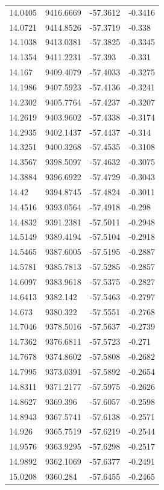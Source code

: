 \begin{table}[H]
\begin{tabular}{llll}
14.0405 & 9416.6669 & -57.3612 & -0.3416 \\
14.0721 & 9414.8526 & -57.3719 & -0.338 \\
14.1038 & 9413.0381 & -57.3825 & -0.3345 \\
14.1354 & 9411.2231 & -57.393 & -0.331 \\
14.167 & 9409.4079 & -57.4033 & -0.3275 \\
14.1986 & 9407.5923 & -57.4136 & -0.3241 \\
14.2302 & 9405.7764 & -57.4237 & -0.3207 \\
14.2619 & 9403.9602 & -57.4338 & -0.3174 \\
14.2935 & 9402.1437 & -57.4437 & -0.314 \\
14.3251 & 9400.3268 & -57.4535 & -0.3108 \\
14.3567 & 9398.5097 & -57.4632 & -0.3075 \\
14.3884 & 9396.6922 & -57.4729 & -0.3043 \\
14.42 & 9394.8745 & -57.4824 & -0.3011 \\
14.4516 & 9393.0564 & -57.4918 & -0.298 \\
14.4832 & 9391.2381 & -57.5011 & -0.2948 \\
14.5149 & 9389.4194 & -57.5104 & -0.2918 \\
14.5465 & 9387.6005 & -57.5195 & -0.2887 \\
14.5781 & 9385.7813 & -57.5285 & -0.2857 \\
14.6097 & 9383.9618 & -57.5375 & -0.2827 \\
14.6413 & 9382.142 & -57.5463 & -0.2797 \\
14.673 & 9380.322 & -57.5551 & -0.2768 \\
14.7046 & 9378.5016 & -57.5637 & -0.2739 \\
14.7362 & 9376.6811 & -57.5723 & -0.271 \\
14.7678 & 9374.8602 & -57.5808 & -0.2682 \\
14.7995 & 9373.0391 & -57.5892 & -0.2654 \\
14.8311 & 9371.2177 & -57.5975 & -0.2626 \\
14.8627 & 9369.396 & -57.6057 & -0.2598 \\
14.8943 & 9367.5741 & -57.6138 & -0.2571 \\
14.926 & 9365.7519 & -57.6219 & -0.2544 \\
14.9576 & 9363.9295 & -57.6298 & -0.2517 \\
14.9892 & 9362.1069 & -57.6377 & -0.2491 \\
15.0208 & 9360.284 & -57.6455 & -0.2465 \\

\end{tabular}
\end{table}
